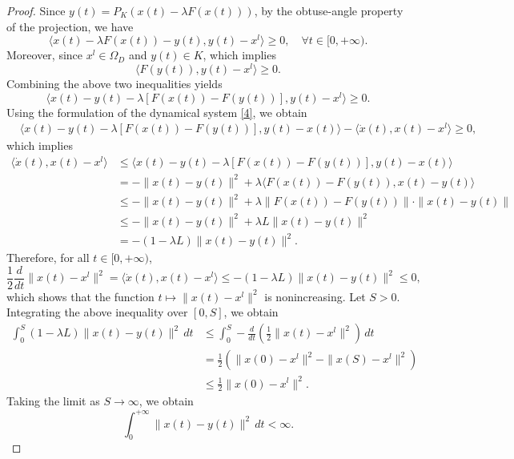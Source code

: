 \documentclass[hidelinks,11 pt]{article}
\numberwithin{equation}{section}
\theoremstyle{definition}  %
\numberwithin{equation}{section}
\numberwithin{theorem}{section}
\begin{document}
\begin{proof}
    Since $y(t) = P_K(x(t) - \lambda F(x(t)))$, by the obtuse-angle property of the projection, we have
    \begin{equation*}
        \langle x(t) - \lambda F(x(t)) - y(t), y(t) - x^l \rangle \geq 0, \quad \forall t \in [0, +\infty).
    \end{equation*}
    Moreover, since $x^l \in \Omega_D$ and $y(t) \in K$, which implies 
    \begin{equation*}
        \langle F(y(t)), y(t) - x^l \rangle \geq 0.
    \end{equation*}
    Combining the above two inequalities yields
    \begin{equation*}
        \langle x(t) - y(t) - \lambda[F(x(t)) - F(y(t))], y(t) - x^l \rangle \geq 0.
    \end{equation*}
    Using the formulation of the dynamical system \eqref{4}, we obtain
    \begin{align*}
        &\langle x(t) - y(t) - \lambda[F(x(t)) - F(y(t))], y(t) - x(t) \rangle - \langle \dot{x}(t), x(t) - x^l \rangle \geq 0,
    \end{align*}
    which implies
    \begin{align*}
        \langle \dot{x}(t), x(t) - x^l \rangle &\leq \langle x(t) - y(t) - \lambda[F(x(t)) - F(y(t))], y(t) - x(t) \rangle \\
        &= -\|x(t) - y(t)\|^2 + \lambda \langle F(x(t)) - F(y(t)), x(t) - y(t) \rangle \\
        &\leq -\|x(t) - y(t)\|^2 + \lambda \|F(x(t)) - F(y(t))\| \cdot \|x(t) - y(t)\| \\
        &\leq -\|x(t) - y(t)\|^2 + \lambda L \|x(t) - y(t)\|^2 \\
        &= -\left(1 -\lambda L\right) \|x(t) - y(t)\|^2. 
    \end{align*}
\vskip 2mm 
    Therefore, for all $t \in [0, +\infty)$,
    \begin{equation*}
        \frac{1}{2} \frac{d}{dt} \|x(t) - x^l\|^2 = \langle \dot{x}(t), x(t) - x^l \rangle \leq -\left(1 - \lambda L\right) \|x(t) - y(t)\|^2 \leq 0,
    \end{equation*}
    which shows that the function $t \mapsto \|x(t) - x^l\|^2$ is nonincreasing.
\vskip 2mm 
    Let $S > 0$. Integrating the above inequality over $[0, S]$, we obtain
    \begin{align*}
        \int_0^S \left(1 - \lambda L\right) \|x(t) - y(t)\|^2 \, dt &\leq \int_0^S -\frac{d}{dt} \left(\frac{1}{2} \|x(t) - x^l\|^2\right) \, dt \\
        &= \frac{1}{2} \left(\|x(0) - x^l\|^2 - \|x(S) - x^l\|^2\right) \\
        &\leq \frac{1}{2} \|x(0) - x^l\|^2.
    \end{align*}
  Taking the limit as \( S \to \infty \), we obtain
\[
    \int_0^{+\infty}  \|x(t) - y(t)\|^2 \, dt < \infty.
\]


\end{proof}
\end{document}

